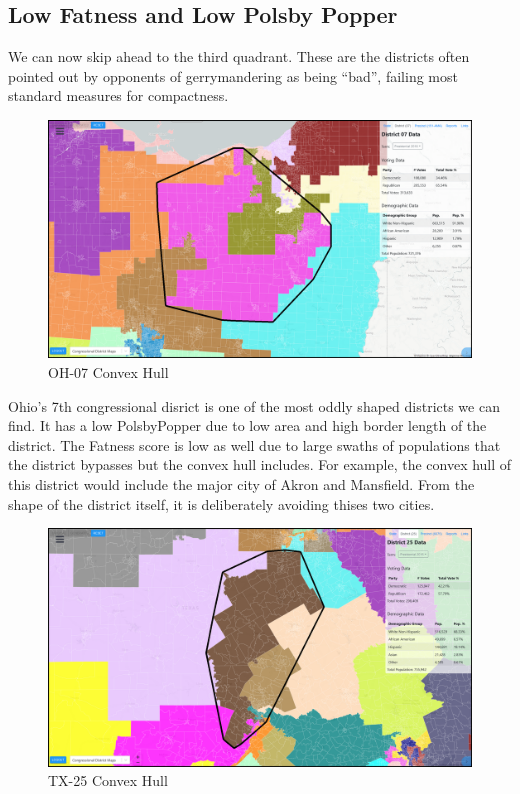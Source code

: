 \documentclass[letterpaper]{article}
\begin{document}
\subsection{Low Fatness and Low Polsby Popper}
We can now skip ahead to the third quadrant. These are the districts often pointed out by opponents of gerrymandering as being “bad”, failing most standard measures for compactness.
\begin{figure}[H]
	\includegraphics[width=\linewidth]{./figures/OH-07-ConvexHull.png}
	\caption{OH-07 Convex Hull}
	\label{fig:oh07ch}
\end{figure}
Ohio's 7th congressional disrict is one of the most oddly shaped districts we can find. It has a low PolsbyPopper due to low area and high border length of the district. The Fatness score is low as well due to large swaths of populations that the district bypasses but the convex hull includes. For example, the convex hull of this district would include the major city of Akron and Mansfield. From the shape of the district itself, it is deliberately avoiding thises two cities.

\begin{figure}[H]
	\includegraphics[width=\linewidth]{./figures/TX-25-ConvexHull.png}
	\caption{TX-25 Convex Hull}
	\label{fig:tx25ch}
\end{figure}
\end{document}
